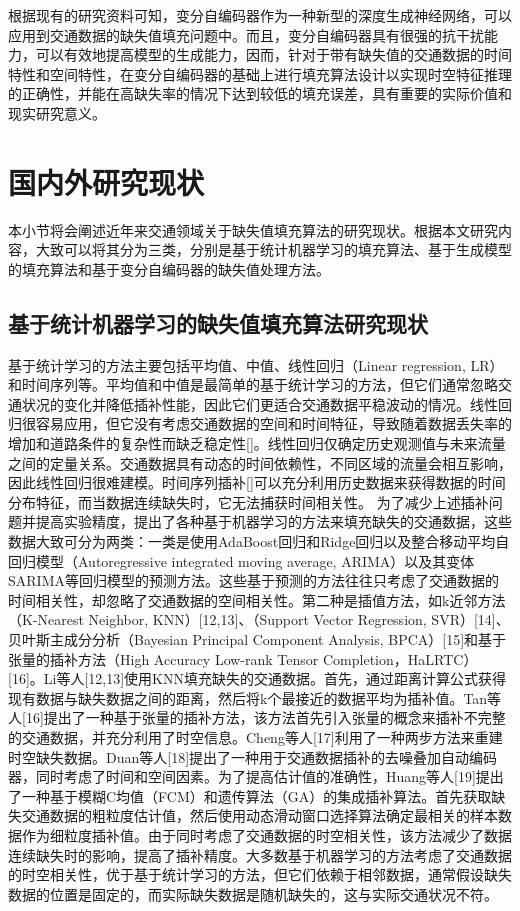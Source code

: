 根据现有的研究资料可知，变分自编码器作为一种新型的深度生成神经网络，可以应用到交通数据的缺失值填充问题中。而且，变分自编码器具有很强的抗干扰能力，可以有效地提高模型的生成能力，因而，针对于带有缺失值的交通数据的时间特性和空间特性，在变分自编码器的基础上进行填充算法设计以实现时空特征推理的正确性，并能在高缺失率的情况下达到较低的填充误差，具有重要的实际价值和现实研究意义。

\section{国内外研究现状}
本小节将会阐述近年来交通领域关于缺失值填充算法的研究现状。根据本文研究内容，大致可以将其分为三类，分别是基于统计机器学习的填充算法、基于生成模型的填充算法和基于变分自编码器的缺失值处理方法。

\subsection{基于统计机器学习的缺失值填充算法研究现状}
基于统计学习的方法主要包括平均值、中值、线性回归（Linear regression, LR）和时间序列等。平均值和中值是最简单的基于统计学习的方法，但它们通常忽略交通状况的变化并降低插补性能，因此它们更适合交通数据平稳波动的情况。线性回归很容易应用，但它没有考虑交通数据的空间和时间特征，导致随着数据丢失率的增加和道路条件的复杂性而缺乏稳定性[]。线性回归仅确定历史观测值与未来流量之间的定量关系。交通数据具有动态的时间依赖性，不同区域的流量会相互影响，因此线性回归很难建模。时间序列插补[]可以充分利用历史数据来获得数据的时间分布特征，而当数据连续缺失时，它无法捕获时间相关性。
为了减少上述插补问题并提高实验精度，提出了各种基于机器学习的方法来填充缺失的交通数据，这些数据大致可分为两类：一类是使用AdaBoost回归和Ridge回归以及整合移动平均自回归模型（Autoregressive integrated moving average, ARIMA）以及其变体SARIMA等回归模型的预测方法。这些基于预测的方法往往只考虑了交通数据的时间相关性，却忽略了交通数据的空间相关性。第二种是插值方法，如k近邻方法（K-Nearest Neighbor, KNN）[12,13]、（Support Vector Regression, SVR）[14]、贝叶斯主成分分析（Bayesian Principal Component Analysis, BPCA）[15]和基于张量的插补方法（High Accuracy Low-rank Tensor Completion，HaLRTC）[16]。Li等人[12,13]使用KNN填充缺失的交通数据。首先，通过距离计算公式获得现有数据与缺失数据之间的距离，然后将k个最接近的数据平均为插补值。Tan等人[16]提出了一种基于张量的插补方法，该方法首先引入张量的概念来插补不完整的交通数据，并充分利用了时空信息。Cheng等人[17]利用了一种两步方法来重建时空缺失数据。Duan等人[18]提出了一种用于交通数据插补的去噪叠加自动编码器，同时考虑了时间和空间因素。为了提高估计值的准确性，Huang等人[19]提出了一种基于模糊C均值（FCM）和遗传算法（GA）的集成插补算法。首先获取缺失交通数据的粗粒度估计值，然后使用动态滑动窗口选择算法确定最相关的样本数据作为细粒度插补值。由于同时考虑了交通数据的时空相关性，该方法减少了数据连续缺失时的影响，提高了插补精度。大多数基于机器学习的方法考虑了交通数据的时空相关性，优于基于统计学习的方法，但它们依赖于相邻数据，通常假设缺失数据的位置是固定的，而实际缺失数据是随机缺失的，这与实际交通状况不符。

